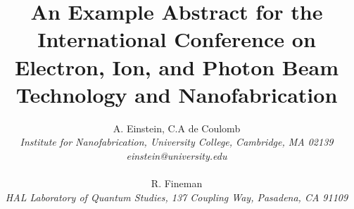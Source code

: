 \documentclass{article}
\begin{document}
\makeatletter
\def\fps@figure{htbp}
\makeatother
\usepackage[normalem]{ulem}
\pdfstringdefDisableCommands{\renewcommand{\sout}{}}
\setlength{\emergencystretch}{3em} %
\providecommand{\tightlist}{%
  \setlength{\itemsep}{0pt}\setlength{\parskip}{0pt}}
\setcounter{secnumdepth}{-\maxdimen} %
\ifLuaTeX
  \usepackage{selnolig}  %
\fi

\usepackage[margin=3cm]{geometry}

\title{An Example Abstract for the International Conference on Electron,
Ion, and Photon Beam Technology and Nanofabrication}
\usepackage{etoolbox}
\makeatletter
\providecommand{\subtitle}[1]{%
  \apptocmd{\@title}{\par {\large #1 \par}}{}{}
}
\makeatother

\author{A. Einstein, C.A de Coulomb \\ 
\emph{Institute for Nanofabrication, University College, Cambridge, MA
02139} \\ \emph{einstein@university.edu} \\
\vspace{3ex} \\ 
R. Fineman \\ 
\emph{HAL Laboratory of Quantum Studies, 137 Coupling Way, Pasadena, CA
91109}}

\date{\vspace{-3ex}}
\end{document}
